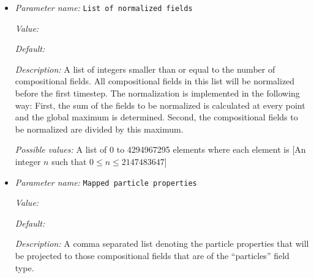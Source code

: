 \begin{itemize}
\begin{itemize}
\item ``prescribed field with diffusion'': If a compositional field is marked this way, the value of a specific additional material model output, called the `PrescribedFieldOutputs' is interpolated onto the field, as in the ``prescribed field'' method. Afterwards, the field is diffused based on a solver parameter, the diffusion length scale, smoothing the field. Specifically, the field is updated by solving the equation $(I-l^2 \Delta) C_\text{smoothed} = C_\text{prescribed}$, where $l$ is the diffusion length scale. Note that this means that the amount of diffusion is independent of the time step size, and that the field is not advected with the flow.\end{itemize}


{\it Possible values:} A list of 0 to 4294967295 elements where each element is [Any one of field, particles, static, melt field, prescribed field, prescribed field with diffusion]
\item {\it Parameter name:} {\tt List of normalized fields}
\label{parameters:Compositional fields/List of normalized fields}


{\it Value:} 


{\it Default:} 


{\it Description:} A list of integers smaller than or equal to the number of compositional fields. All compositional fields in this list will be normalized before the first timestep. The normalization is implemented in the following way: First, the sum of the fields to be normalized is calculated at every point and the global maximum is determined. Second, the compositional fields to be normalized are divided by this maximum.


{\it Possible values:} A list of 0 to 4294967295 elements where each element is [An integer $n$ such that $0\leq n \leq 2147483647$]
\item {\it Parameter name:} {\tt Mapped particle properties}
\label{parameters:Compositional fields/Mapped particle properties}


{\it Value:} 


{\it Default:} 


{\it Description:} A comma separated list denoting the particle properties that will be projected to those compositional fields that are of the ``particles'' field type.


\end{itemize}
